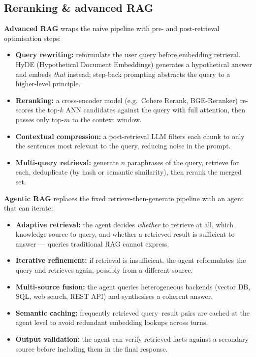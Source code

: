 \subsection{Reranking \& advanced RAG}

\textbf{Advanced RAG} wraps the naive pipeline with pre- and post-retrieval
optimisation steps:

\begin{itemize}
  \item \textbf{Query rewriting:} reformulate the user query before embedding retrieval.
    HyDE (Hypothetical Document Embeddings) generates a hypothetical answer and embeds
    \emph{that} instead; step-back prompting abstracts the query to a higher-level principle.
  \item \textbf{Reranking:} a cross-encoder model (e.g.\ Cohere Rerank, BGE-Reranker)
    re-scores the top-$k$ ANN candidates against the query with full attention, then
    passes only top-$m$ to the context window.
  \item \textbf{Contextual compression:} a post-retrieval LLM filters each chunk to
    only the sentences most relevant to the query, reducing noise in the prompt.
  \item \textbf{Multi-query retrieval:} generate $n$ paraphrases of the query, retrieve
    for each, deduplicate (by hash or semantic similarity), then rerank the merged set.
\end{itemize}

\textbf{Agentic RAG} replaces the fixed retrieve-then-generate pipeline with an agent
that can iterate:

\begin{itemize}
  \item \textbf{Adaptive retrieval:} the agent decides \emph{whether} to retrieve at
    all, which knowledge source to query, and whether a retrieved result is sufficient
    to answer --- queries traditional RAG cannot express.
  \item \textbf{Iterative refinement:} if retrieval is insufficient, the agent
    reformulates the query and retrieves again, possibly from a different source.
  \item \textbf{Multi-source fusion:} the agent queries heterogeneous backends (vector
    DB, SQL, web search, REST API) and synthesises a coherent answer.
  \item \textbf{Semantic caching:} frequently retrieved query--result pairs are cached
    at the agent level to avoid redundant embedding lookups across turns.
  \item \textbf{Output validation:} the agent can verify retrieved facts against a
    secondary source before including them in the final response.
\end{itemize}

